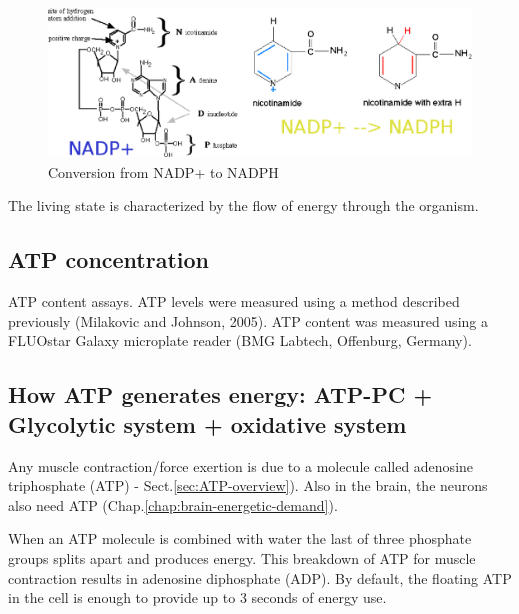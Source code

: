 \begin{figure}[hbt]
  \centerline{\includegraphics[height=4cm,
    angle=0]{./images/NADP_NADPH.eps}}
\caption{Conversion from NADP+ to NADPH}
\label{fig:NADP_NADPH}
\end{figure}


\begin{framed}
  The living state is characterized by the flow of energy through the organism.
\end{framed}

\subsection{ATP concentration}
\label{sec:ATP-concentration}

ATP content assays. ATP levels were measured using a method described previously
(Milakovic and Johnson, 2005). ATP content was measured using a FLUOstar Galaxy
microplate reader (BMG Labtech, Offenburg, Germany).

\subsection{How ATP generates energy: ATP-PC + Glycolytic system + oxidative
system}
\label{sec:enery-production-pathways}

Any muscle contraction/force exertion is due to a molecule called adenosine
triphosphate (ATP) - Sect.\ref{sec:ATP-overview}). Also in the brain, the
neurons also need ATP (Chap.\ref{chap:brain-energetic-demand}).

When an ATP molecule is combined with water the last of three phosphate groups
splits apart and produces energy. This breakdown of ATP for muscle contraction
results in adenosine diphosphate (ADP). By default, the floating ATP in the cell
is enough to provide up to 3 seconds of energy use.

